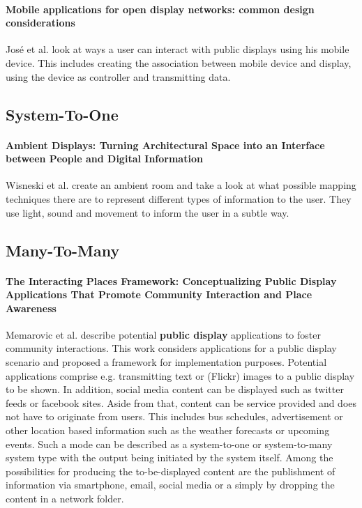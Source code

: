 \paragraph{Mobile applications for open display networks: common design considerations}
José et al. \cite{jose_mobile_2013} look at ways a user can interact with public displays using his mobile device.
This includes creating the association between mobile device and display, using the device as controller and transmitting data.


\subsection{System-To-One}

\paragraph{Ambient Displays: Turning Architectural Space into an Interface between People and Digital Information}
Wisneski et al. \cite{wisneski_ambient_1998} create an ambient room and take a look at what possible mapping techniques there are to represent different types of information to the user. They use light, sound and movement to inform the user in a subtle way.

\subsection{Many-To-Many}

\paragraph{The Interacting Places Framework: Conceptualizing Public Display Applications That Promote Community Interaction and Place Awareness}
Memarovic et al. \cite{memarovic_places} describe potential \textbf{public display} applications to foster community interactions.
This work considers applications for a public display scenario and proposed a framework for implementation purposes.
Potential applications comprise e.g. transmitting text or (Flickr) images to a public display to be shown.
In addition, social media content can be displayed such as twitter feeds or facebook sites.
Aside from that, content can be service provided and does not have to originate from users.
This includes bus schedules, advertisement or other location based information such as the weather forecasts or upcoming events.
Such a mode can be described as a system-to-one or system-to-many system type with the output being initiated by the system itself.
Among the possibilities for producing the to-be-displayed content are the publishment of information via smartphone, email, social media or a simply by dropping the content in a network folder.

